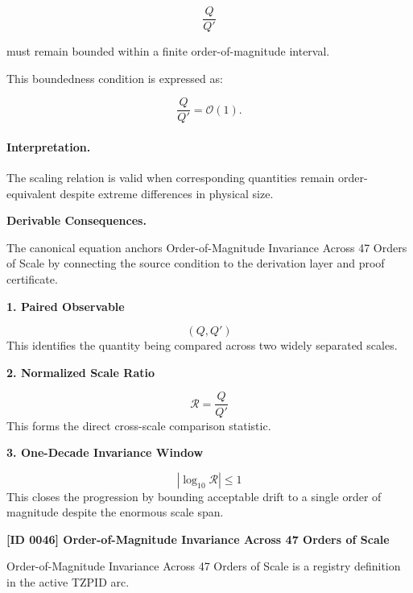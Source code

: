 \begin{equation}
\frac{Q}{Q'}
\end{equation}

must remain bounded within a finite order-of-magnitude interval.

This boundedness condition is expressed as:

\begin{equation}
\boxed{
\frac{Q}{Q'}
=
\mathcal{O}(1).
}
\end{equation}

\paragraph{Interpretation.}
The scaling relation is valid when corresponding quantities remain order-equivalent despite extreme differences in physical size.

\par\vspace{0.35em}
\noindent\textbf{Derivable Consequences.}\quad
\begingroup
\footnotesize
\raggedright
The canonical equation anchors Order-of-Magnitude Invariance Across 47 Orders of Scale by connecting the source condition to the derivation layer and proof certificate.
\par\endgroup

\noindent\textbf{1. Paired Observable}\par
\[
(Q, Q')
\]
\noindent This identifies the quantity being compared across two widely separated scales.\par
\noindent\textbf{2. Normalized Scale Ratio}\par
\[
\mathcal{R}
=
\frac{Q}{Q'}
\]
\noindent This forms the direct cross-scale comparison statistic.\par
\noindent\textbf{3. One-Decade Invariance Window}\par
\[
\left|\log_{10}\mathcal{R}\right| \leq 1
\]
\noindent This closes the progression by bounding acceptable drift to a single order of magnitude despite the enormous scale span.\par

\clearpage
\noindent\textbf{[ID 0046] Order-of-Magnitude Invariance Across 47 Orders of Scale}\par
\vspace{0.35em}
\begingroup\small
{}
Order-of-Magnitude Invariance Across 47 Orders of Scale is a registry definition in the active TZPID arc.

